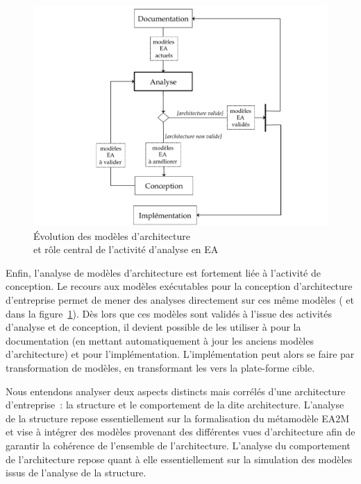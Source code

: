 \begin{figure}[!ht] \begin{center}
    \includegraphics[width=1\textwidth]{figures/4_demarche/activite_ea.pdf}
    \end{center}
    \caption{Évolution des modèles d'architecture\\et rôle central de l'activité d'analyse en EA}
    \label{fig:activite_ea}
\end{figure}

Enfin, l'analyse de modèles d'architecture est fortement liée à l'activité de conception. Le recours aux modèles
exécutables pour la conception d'architecture d'entreprise permet de mener des analyses directement sur ces
même modèles ( et  dans la figure~\ref{fig:activite_ea}). Dès lors que ces modèles sont validés à l'issue des activités d'analyse et de conception,
il devient possible de les utiliser à pour la documentation (en mettant
automatiquement à jour les anciens modèles d'architecture) et pour l'implémentation. L'implémentation peut 
alors se faire par transformation de modèles, en transformant les  vers la plate-forme cible.

Nous entendons analyser deux aspects distincts mais corrélés d'une architecture
d'entreprise~: la structure et le comportement de la dite architecture.
L'analyse de la structure repose essentiellement sur la formalisation du métamodèle EA2M et vise à 
intégrer des modèles provenant des différentes vues d'architecture afin de garantir la cohérence
de l'ensemble de l'architecture. L'analyse du comportement de l'architecture repose quant à elle
essentiellement sur la simulation des modèles issus de l'analyse de la structure.

